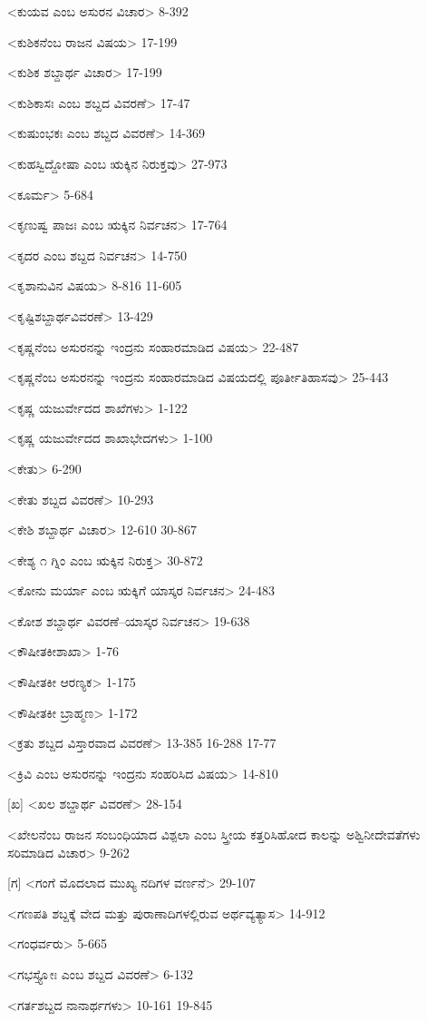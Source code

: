 <ಕುಯವ ಎಂಬ ಅಸುರನ ವಿಚಾರ>
8-392

<ಕುಶಿಕನೆಂಬ ರಾಜನ ವಿಷಯ>
17-199

<ಕುಶಿಕ ಶಬ್ದಾರ್ಥ ವಿಚಾರ>
17-199

<ಕುಶಿಕಾಸಃ ಎಂಬ ಶಬ್ದದ ವಿವರಣೆ>
17-47

<ಕುಷುಂಭಕಃ ಎಂಬ ಶಬ್ದದ ವಿವರಣೆ>
14-369

<ಕುಹಸ್ವಿದ್ದೋಷಾ ಎಂಬ ಋಕ್ಕಿನ ನಿರುಕ್ತವು>
27-973

<ಕೂರ್ಮ>
5-684

<ಕೃಣುಷ್ವ ಪಾಜಃ ಎಂಬ ಋಕ್ಕಿನ ನಿರ್ವಚನ>
17-764

<ಕೃದರ ಎಂಬ ಶಬ್ದದ ನಿರ್ವಚನ>
14-750

<ಕೃಶಾನುವಿನ ವಿಷಯ>
8-816
11-605

<ಕೃಷ್ಟಿಶಬ್ದಾರ್ಥವಿವರಣೆ>
13-429

<ಕೃಷ್ಣನೆಂಬ ಅಸುರನನ್ನು ಇಂದ್ರನು ಸಂಹಾರಮಾಡಿದ ವಿಷಯ>
22-487

<ಕೃಷ್ಣನೆಂಬ ಅಸುರನನ್ನು ಇಂದ್ರನು ಸಂಹಾರಮಾಡಿದ ವಿಷಯದಲ್ಲಿ ಪೂರ್ತೀತಿಹಾಸವು>
25-443

<ಕೃಷ್ಣ ಯಜುರ್ವೇದದ ಶಾಖೆಗಳು>
1-122

<ಕೃಷ್ಣ ಯಜುರ್ವೇದದ ಶಾಖಾಭೇದಗಳು>
1-100

<ಕೇತು>
6-290

<ಕೇತು ಶಬ್ದದ ವಿವರಣೆ>
10-293

<ಕೇಶಿ ಶಬ್ದಾರ್ಥ ವಿಚಾರ>
12-610
30-867

<ಕೇಶ್ಯ ೧ ಗ್ನಿಂ ಎಂಬ ಋಕ್ಕಿನ ನಿರುಕ್ತ>
30-872

<ಕೋನು ಮರ್ಯಾ ಎಂಬ ಋಕ್ಕಿಗೆ ಯಾಸ್ಕರ ನಿರ್ವಚನ>
24-483

<ಕೋಶ ಶಬ್ದಾರ್ಥ ವಿವರಣೆ–ಯಾಸ್ಕರ ನಿರ್ವಚನ>
19-638

<ಕೌಷೀತಕೀಶಾಖಾ>
1-76

<ಕೌಷೀತಕೀ ಆರಣ್ಯಕ>
1-175

<ಕೌಷೀತಕೀ ಬ್ರಾಹ್ಮಣ>
1-172

<ಕ್ರತು ಶಬ್ದದ ವಿಸ್ತಾರವಾದ ವಿವರಣೆ>
13-385 
16-288 
17-77

<ಕ್ರಿವಿ ಎಂಬ ಅಸುರನನ್ನು ಇಂದ್ರನು ಸಂಹರಿಸಿದ ವಿಷಯ>
14-810

[ಖ]
<ಖಲ ಶಬ್ದಾರ್ಥ ವಿವರಣೆ>
28-154


<ಖೇಲನೆಂಬ ರಾಜನ ಸಂಬಂಧಿಯಾದ ವಿಶ್ಪಲಾ ಎಂಬ ಸ್ತ್ರೀಯ ಕತ್ತರಿಸಿಹೋದ ಕಾಲನ್ನು ಅಶ್ವಿನೀದೇವತೆಗಳು ಸರಿಮಾಡಿದ ವಿಚಾರ>
9-262

[ಗ]
<ಗಂಗೆ ಮೊದಲಾದ ಮುಖ್ಯ ನದಿಗಳ ವರ್ಣನೆ>
29-107

<ಗಣಪತಿ ಶಬ್ದಕ್ಕೆ ವೇದ ಮತ್ತು ಪುರಾಣಾದಿಗಳಲ್ಲಿರುವ ಅರ್ಥವ್ಯತ್ಯಾಸ>
14-912

<ಗಂಧರ್ವರು>
5-665

<ಗಭಸ್ತ್ಯೋಃ ಎಂಬ ಶಬ್ದದ ವಿವರಣೆ>
6-132

<ಗರ್ತಶಬ್ದದ ನಾನಾರ್ಥಗಳು>
10-161
19-845

